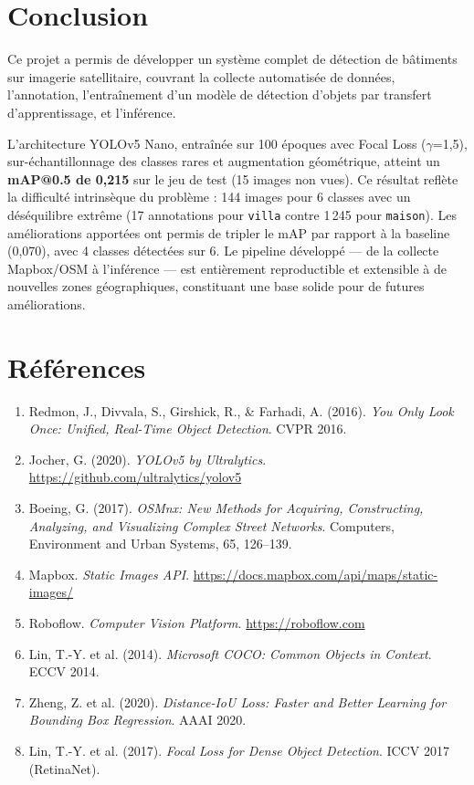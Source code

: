 \documentclass[12pt,a4paper]{article}
\begin{document}
\section{Conclusion}

Ce projet a permis de développer un système complet de détection de bâtiments sur imagerie satellitaire, couvrant la collecte automatisée de données, l'annotation, l'entraînement d'un modèle de détection d'objets par transfert d'apprentissage, et l'inférence.

L'architecture YOLOv5 Nano, entraînée sur 100 époques avec Focal Loss ($\gamma$=1,5), sur-échantillonnage des classes rares et augmentation géométrique, atteint un \textbf{mAP@0.5 de 0,215} sur le jeu de test (15 images non vues). Ce résultat reflète la difficulté intrinsèque du problème : 144 images pour 6 classes avec un déséquilibre extrême (17 annotations pour \texttt{villa} contre 1\,245 pour \texttt{maison}). Les améliorations apportées ont permis de tripler le mAP par rapport à la baseline (0,070), avec 4 classes détectées sur 6. Le pipeline développé --- de la collecte Mapbox/OSM à l'inférence --- est entièrement reproductible et extensible à de nouvelles zones géographiques, constituant une base solide pour de futures améliorations.

\section*{Références}

\begin{enumerate}
    \item Redmon, J., Divvala, S., Girshick, R., \& Farhadi, A. (2016). \textit{You Only Look Once: Unified, Real-Time Object Detection}. CVPR 2016.
    \item Jocher, G. (2020). \textit{YOLOv5 by Ultralytics}. \url{https://github.com/ultralytics/yolov5}
    \item Boeing, G. (2017). \textit{OSMnx: New Methods for Acquiring, Constructing, Analyzing, and Visualizing Complex Street Networks}. Computers, Environment and Urban Systems, 65, 126--139.
    \item Mapbox. \textit{Static Images API}. \url{https://docs.mapbox.com/api/maps/static-images/}
    \item Roboflow. \textit{Computer Vision Platform}. \url{https://roboflow.com}
    \item Lin, T.-Y. et al. (2014). \textit{Microsoft COCO: Common Objects in Context}. ECCV 2014.
    \item Zheng, Z. et al. (2020). \textit{Distance-IoU Loss: Faster and Better Learning for Bounding Box Regression}. AAAI 2020.
    \item Lin, T.-Y. et al. (2017). \textit{Focal Loss for Dense Object Detection}. ICCV 2017 (RetinaNet).
\end{enumerate}
\end{document}
